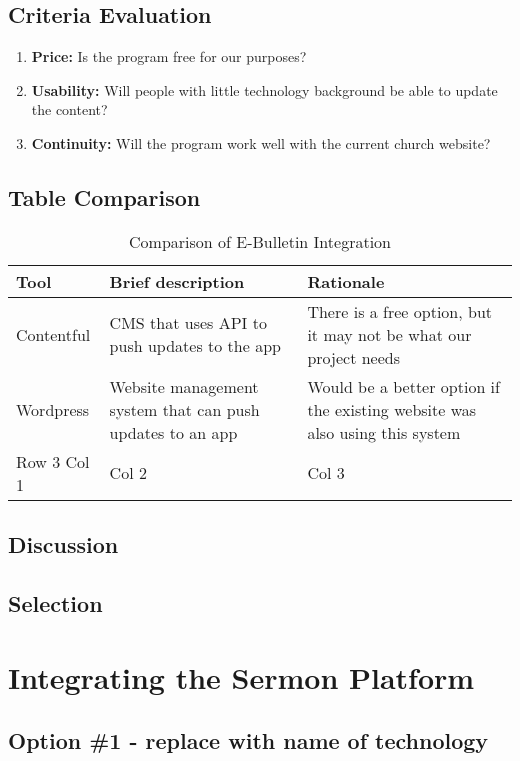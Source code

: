 \documentclass[letterpaper,10pt,draftclsnofoot,onecolumn,titlepage]{IEEEtran}
\begin{document}
	\subsection{Criteria Evaluation}
		\begin{enumerate}
			\item \textbf{Price:} Is the program free for our purposes? 
			\item \textbf{Usability:} Will people with little technology background be able to update the content? 
			\item \textbf{Continuity:} Will the program work well with the current church website? 
		\end{enumerate}
	\subsection{Table Comparison}
	\begin{table}[ht]
	\caption{Comparison of E-Bulletin Integration}
	\begin{center}
	\begin{tabular} { | m{3cm} | m{5cm} | m{5cm} | }
	\hline\hline
	Tool & Brief description & Rationale \\ [0.5ex]
	\hline
	Contentful & CMS that uses API to push updates to the app & There is a free option, but it may not be what our project needs \\
	\hline
	Wordpress & Website management system that can push updates to an app & Would be a better option if the existing website was also using this system \\
	\hline
	Row 3 Col 1 & Col 2 & Col 3 \\
	\hline
	\end{tabular}
	\end{center}
	\end{table}
	\subsection{Discussion}
	\subsection{Selection}

	\section{Integrating the Sermon Platform}
	\subsection{Option \#1 - replace with name of technology}
\end{document}
